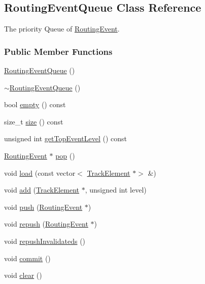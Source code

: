 \hypertarget{classKite_1_1RoutingEventQueue}{}\subsection{Routing\+Event\+Queue Class Reference}
\label{classKite_1_1RoutingEventQueue}


The priority Queue of \hyperlink{classKite_1_1RoutingEvent}{Routing\+Event}.  


\subsubsection*{Public Member Functions}
\begin{DoxyCompactItemize}
\item 
\hyperlink{classKite_1_1RoutingEventQueue_a67dd3abe4f9f4f32e91dfaa9573976ca}{Routing\+Event\+Queue} ()
\item 
\hyperlink{classKite_1_1RoutingEventQueue_a28ed9894863ae1029f16744a86d4bfab}{$\sim$\+Routing\+Event\+Queue} ()
\item 
bool \hyperlink{classKite_1_1RoutingEventQueue_a644718bb2fb240de962dc3c9a1fdf0dc}{empty} () const
\item 
size\+\_\+t \hyperlink{classKite_1_1RoutingEventQueue_a259cb5a711406a8c3e5d937eb9350cca}{size} () const
\item 
unsigned int \hyperlink{classKite_1_1RoutingEventQueue_a85befa55ce7e51c7067f4f7cb29acc0a}{get\+Top\+Event\+Level} () const
\item 
\hyperlink{classKite_1_1RoutingEvent}{Routing\+Event} $\ast$ \hyperlink{classKite_1_1RoutingEventQueue_af1b85d0b49565932c55ec55625cd8838}{pop} ()
\item 
void \hyperlink{classKite_1_1RoutingEventQueue_a7f5a051812b2925dc3c1cca8b2011237}{load} (const vector$<$ \hyperlink{classKite_1_1TrackElement}{Track\+Element} $\ast$$>$ \&)
\item 
void \hyperlink{classKite_1_1RoutingEventQueue_af0813b67c9fc72d960f7e512e9403d57}{add} (\hyperlink{classKite_1_1TrackElement}{Track\+Element} $\ast$, unsigned int level)
\item 
void \hyperlink{classKite_1_1RoutingEventQueue_ac802427673567526d06af911e94f7216}{push} (\hyperlink{classKite_1_1RoutingEvent}{Routing\+Event} $\ast$)
\item 
void \hyperlink{classKite_1_1RoutingEventQueue_afd2fa6d6f5d90c472bea9befa97d955d}{repush} (\hyperlink{classKite_1_1RoutingEvent}{Routing\+Event} $\ast$)
\item 
void \hyperlink{classKite_1_1RoutingEventQueue_a4fb0022d3e8f91a862b5f6438b7f8dad}{repush\+Invalidateds} ()
\item 
void \hyperlink{classKite_1_1RoutingEventQueue_ad55316f5135cdae6aa6c5a763f6c3473}{commit} ()
\item 
void \hyperlink{classKite_1_1RoutingEventQueue_ac8bb3912a3ce86b15842e79d0b421204}{clear} ()
\end{DoxyCompactItemize}


